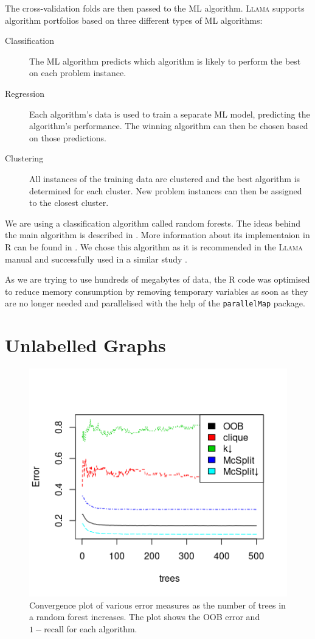 \documentclass{l4proj}
\theoremstyle{definition}
\theoremstyle{remark}
\begin{document}
The cross-validation folds are then passed to the ML algorithm. \textsc{Llama}
supports algorithm portfolios based on three different types of ML algorithms:

\begin{description}
  \item[Classification] The ML algorithm predicts which algorithm is likely to
    perform the best on each problem instance.
  \item[Regression] Each algorithm's data is used to train a separate ML model,
    predicting the algorithm's performance. The winning algorithm can then be
    chosen based on those predictions.
  \item[Clustering] All instances of the training data are clustered and the
    best algorithm is determined for each cluster. New problem instances can
    then be assigned to the closest cluster.
\end{description}

We are using a classification algorithm called random forests. The ideas behind
the main algorithm is described in \cite{DBLP:journals/ml/Breiman01}. More
information about its implementaion in R can be found in \cite{randomforest}. We
chose this algorithm as it is recommended in the \textsc{Llama} manual
\cite{kotthoff_llama_2013} and successfully used in a similar study
\cite{DBLP:conf/lion/KotthoffMS16}.

As we are trying to use hundreds of megabytes of data, the R code was optimised
to reduce memory consumption by removing temporary variables as soon as they are
no longer needed and parallelised with the help of the \texttt{parallelMap}
package.

\section{Unlabelled Graphs}

\begin{figure}
  \centering
  \includegraphics{images/unlabelled_forest_errors.png}
  \caption{Convergence plot of various error measures as the number of trees in
    a random forest increases. The plot shows the OOB error and $1 -
    \text{recall}$ for each algorithm.}
  \label{fig:unlabelled_forest_errors}
\end{figure}
\end{document}
